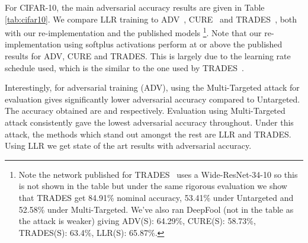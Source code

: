 \documentclass{article}
\theoremstyle{plain}
\theoremstyle{definition}
\theoremstyle{remark}
\begin{document}
For CIFAR-10, the main adversarial accuracy results are given in Table \ref{tab:cifar10}. We compare LLR training to ADV~\citep{madry2017towards}, CURE~\citep{moosavi2018robustness} and TRADES~\citep{zhang2019theoretically}, both with our re-implementation and the published models \footnote{Note the network published for TRADES~\citep{zhang2019theoretically} uses a Wide-ResNet-34-10 so this is not shown in the table but under the same rigorous evaluation we show that TRADES get 84.91\% nominal accuracy, 53.41\% under Untargeted and 52.58\% under Multi-Targeted. We've also ran DeepFool (not in the table as the attack is weaker) giving ADV(S): 64.29\%, CURE(S): 58.73\%, TRADES(S): 63.4\%, LLR(S): 65.87\%.}. Note that our re-implementation using softplus activations perform at or above the published results for ADV, CURE and TRADES. This is largely due to the learning rate schedule used, which is the similar to the one used by TRADES~\citep{zhang2019theoretically}.

Interestingly, for adversarial training (ADV), using the Multi-Targeted attack for evaluation gives significantly lower adversarial accuracy compared to Untargeted. The accuracy obtained are  and  respectively. Evaluation using Multi-Targeted attack consistently gave the lowest adversarial accuracy throughout. Under this attack, the methods which stand out amongst the rest are LLR and TRADES. Using LLR we get state of the art results with  adversarial accuracy. 
\end{document}
